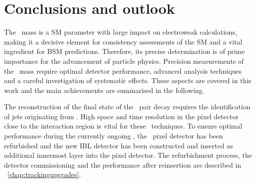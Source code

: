 \chapter{Conclusions and outlook}
\label{chap:conclusion}
%
The \tquark\ mass is a \gls{SM} parameter with large impact on electroweak calculations, making it a decisive element for consistency assessments of the \gls{SM} and a vital ingredient for \gls{BSM} predictions. Therefore, its precise determination is of prime importance for the advancement of particle physics.
%
Precision measurements of the \tquark\ mass require optimal detector performance, advanced analysis techniques and a careful investigation of systematic effects. These aspects are covered in this work and the main achievements are summarised in the following.


The reconstruction of the final state of the \tquark\ pair decay requires the identification of jets originating from . High space and time resolution in the pixel detector close to the interaction region is vital for these \btag\ techniques. To ensure optimal performance during the currently ongoing \RunTwo, the \RunOne\ pixel detector has been refurbished and the new \gls{IBL} detector has been constructed and inserted as additional innermost layer into the pixel detector. The refurbishment process, the detector commissioning and the performance after reinsertion are described in \chap~\ref{chap:trackingupgrades}.


